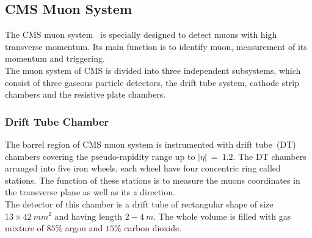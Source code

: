 \subsection{CMS Muon System}
The CMS muon system~\cite{Sirunyan_2018} is specially designed to detect muons with high transverse momentum. Its main function is to identify muon, measurement of its momentum and triggering.\\
The muon system of CMS is divided into three independent subsystems, which consist of three gaseous particle detectors, the drift tube system, cathode strip chambers and the resistive plate chambers.\\
\subsubsection{Drift Tube Chamber}
The barrel region of CMS muon system is instrumented with drift tube~(DT) chambers covering the pseudo-rapidity range up to $|\eta|~=~1.2$. The DT chambers arranged into five iron wheels, each wheel have four concentric ring called stations. The function of these stations is to measure the muons coordinates in the transverse plane as well as its $z$ direction.\\
The detector of this chamber is a drift tube of rectangular shape of size $ 13\times42~mm^{2}$ and having length $2-4~m$. The whole volume is filled with gas mixture of $85\%$ argon and $15\%$ carbon dioxide.\\
